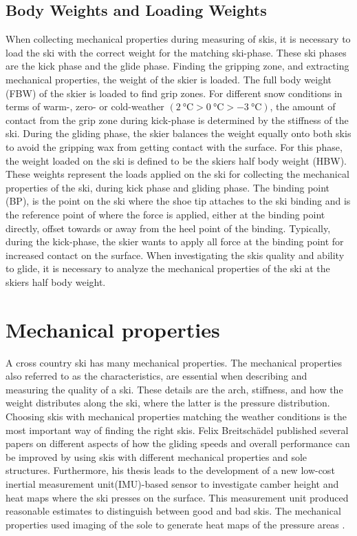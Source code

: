 \subsection{Body Weights and Loading Weights}
\label{subsec:bw}
When collecting mechanical properties during measuring of skis, it is necessary to load the ski with the correct weight for the matching ski-phase. These ski phases are the kick phase and the glide phase. Finding the gripping zone, and extracting mechanical properties, the weight of the skier is loaded. The full body weight (FBW) of the skier is loaded to find grip zones. For different snow conditions in terms of warm-, zero- or cold-weather $(\SI{2}{\celsius}> \SI{0}{\celsius} >\SI{-3}{\celsius})$,  the amount of contact from the grip zone during kick-phase is determined by the stiffness of the ski.
During the gliding phase, the skier balances the weight equally onto both skis to avoid the gripping wax from getting contact with the surface. For this phase, the weight loaded on the ski is defined to be the skiers half body weight (HBW).
These weights represent the loads applied on the ski for collecting the mechanical properties of the ski, during kick phase and gliding phase. The binding point (BP), is the point on the ski where the shoe tip attaches to the ski binding and is the reference point of where the force is applied, either at the binding point directly, offset towards or away from the heel point of the binding. Typically, during the kick-phase, the skier wants to apply all force at the binding point for increased contact on the surface. When investigating the skis quality and ability to glide, it is necessary to analyze the mechanical properties of the ski at the skiers half body weight.

\section{Mechanical properties}
\label{sec:mechanicalproperties}
A cross country ski has many mechanical properties. The mechanical properties also referred to as the characteristics, are essential when describing and measuring the quality of a ski. These details are the arch, stiffness, and how the weight distributes along the ski, where the latter is the pressure distribution. Choosing skis with mechanical properties matching the weather conditions is the most important way of finding the right skis. Felix Breitschädel published several papers on different aspects of how the gliding speeds and overall performance can be improved by using skis with different mechanical properties and sole structures.
Furthermore, his thesis leads to the development of a new low-cost inertial measurement unit(IMU)-based sensor to investigate camber height and heat maps where the ski presses on the surface. This measurement unit produced reasonable estimates to distinguish between good and bad skis. The mechanical properties used imaging of the sole to generate heat maps of the pressure areas \citep{breitschadel_technical_2014}. 
\newline


